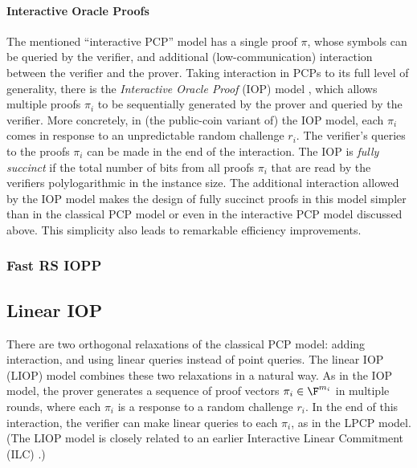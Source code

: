 \paragraph{Interactive Oracle Proofs} 
The mentioned ``interactive PCP'' model has a single proof $\pi$, whose symbols can be queried by the verifier, and additional (low-communication) interaction between the verifier and the prover. 
Taking interaction in PCPs to its full level of generality, 
there is the {\em Interactive Oracle Proof} (IOP) model \cite{2016:BCS:tcc:IOPs,2016:RRR:stoc:Constant-round-IP-for-Delegating-Computation},
which allows multiple proofs $\pi_i$ to be sequentially generated by the prover and queried by the verifier. 
More concretely, in (the public-coin variant of) the IOP model, each $\pi_i$ comes in response to an unpredictable random challenge $r_i$. 
The verifier's queries to the proofs $\pi_i$ can be made in the end of the interaction. 
The IOP is {\em fully succinct} if the total number of bits from all proofs $\pi_i$ that are read by the verifiers polylogarithmic in the instance size.
The additional interaction allowed by the IOP model makes the design of fully succinct proofs in this model simpler than in the classical PCP model or even in the interactive PCP model discussed above.
This simplicity also leads to remarkable efficiency improvements.
\loosen


\subsubsection{Fast RS IOPP}
\label{paradigms:IT:IOP:fast-RS-IOPP}

\WANTED[]


\subsection{Linear IOP}
\label{paradigms:IT:linear-IOP}

There are two orthogonal relaxations of the classical PCP model: adding interaction, and using linear queries instead of point queries.
The linear IOP (LIOP) model \cite{2019:BBCGI:crypto:ZKPs-on-secret-shared-data-via-FLPCP} combines these two relaxations in a natural way.
As in the IOP model, the prover generates a sequence of proof vectors $\pi_i\in\F^{m_i}$ in multiple rounds, where each $\pi_i$ is a response to a random challenge $r_i$.
In the end of this interaction, the verifier can make linear queries to each $\pi_i$, as in the LPCP model.
(The LIOP model is closely related to an earlier Interactive Linear Commitment (ILC) \cite{2017:BCGGHJ:linear-time-ZKPs-arithm-circ-sat}.)


